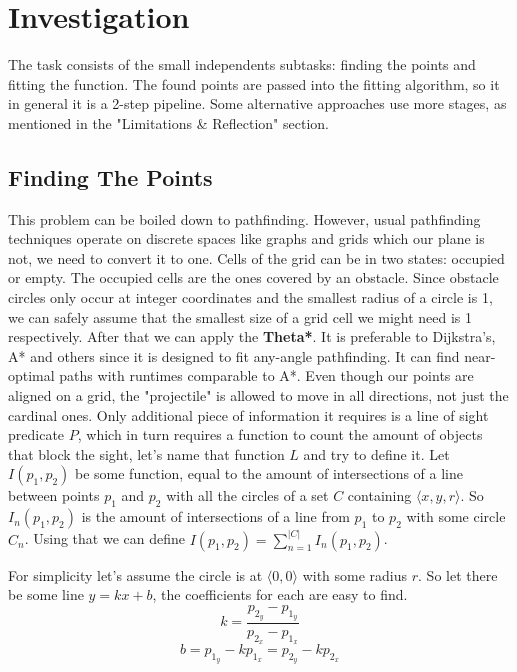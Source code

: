 \documentclass[12pt, titlepage]{article}
\begin{document}
\section{Investigation}
The task consists of the small independents subtasks: finding the points and 
fitting the function. The found points are passed into the fitting algorithm,
so it in general it is a 2-step pipeline. Some alternative approaches use
more stages, as mentioned in the "Limitations \& Reflection" section. 

\subsection{Finding The Points}
This problem can be boiled down to pathfinding. However, usual pathfinding
techniques operate on discrete spaces like graphs and grids which our plane
is not, we need to convert it to one. Cells of the grid can be in two states:
occupied or empty. The occupied cells are the ones covered by an obstacle. 
Since obstacle circles only occur at integer coordinates and the smallest
radius of a circle is 1, we can safely assume that the smallest size of a grid
cell we might need is 1 respectively. After that we can apply the \textbf{Theta*}.
It is preferable to Dijkstra's, A* and others since it is designed to fit
any-angle pathfinding. It can find near-optimal paths with runtimes comparable
to A*. Even though our points are aligned on a grid,
the "projectile" is allowed to move in all directions, not just the cardinal ones. 
Only additional piece of information it requires is a line of sight predicate $P$,
which in turn requires a function to count the amount of objects that block the
sight, let's name that function $L$ and try to define it.
Let $I(p_1, p_2)$ be some function, equal to the amount of intersections of a 
line between points $p_1$ and $p_2$  with all the circles of a set $C$ containing 
$\langle x, y, r \rangle$. So $I_n(p_1, p_2)$ is the amount of intersections
of a line from $p_1$ to $p_2$ with some circle $C_n$. 
Using that we can define $I(p_1, p_2) = \sum_{n=1}^{|C|}I_n(p_1, p_2)$.

For simplicity let's assume the circle is at $\langle 0, 0 \rangle$ with
some radius $r$.
So let there be some line $y = kx + b$, the coefficients for each are easy to find.
\begin{equation}
    k = \frac{p_{2_y}-p_{1_y}}{p_{2_x}-p_{1_x}}
\end{equation}
\begin{equation}
    b = p_{1_y} - k p_{1_x} = p_{2_y} - k p_{2_x} 
\end{equation}
\end{document}
